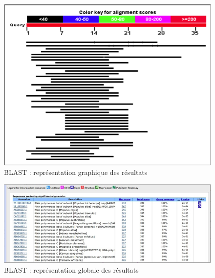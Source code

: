 \documentclass[12pt, openany]{report}
\begin{document}
\begin{figure}[H]
\begin{center}
    \includegraphics[scale=1]{Images/im6.png}
\caption{BLAST : représentation graphique des résultats}\label{fig:graphe}
\end{center}
\end{figure}

\begin{figure}[H]
\begin{center}
    \includegraphics[scale=1]{Images/im7.png}
\caption{BLAST : représentation globale des résultats}\label{fig:global}
\end{center}
\end{figure}
\end{document}
